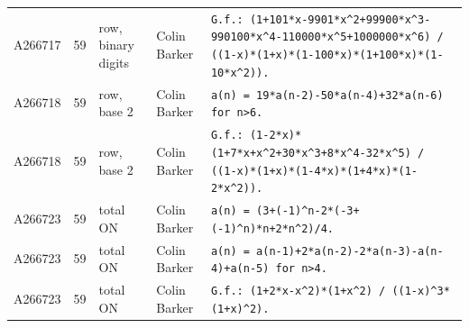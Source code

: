 \documentclass[11pt]{article}
\theoremstyle{definition}
\theoremstyle{remark}
\begin{document}
{\begin{longtable}{p{1.3cm}p{0.7cm}p{2.4cm}p{2.3cm}p{7.3cm}}
A266717 & 59 & row, binary digits & Colin Barker & \texttt{G.f.: \allowbreak{}(1+\allowbreak{}101*\allowbreak{}x-\allowbreak{}9901*\allowbreak{}x\^{}2+\allowbreak{}99900*\allowbreak{}x\^{}3-\allowbreak{}990100*\allowbreak{}x\^{}4-\allowbreak{}110000*\allowbreak{}x\^{}5+\allowbreak{}1000000*\allowbreak{}x\^{}6)\allowbreak{} \allowbreak{}/\allowbreak{} \allowbreak{}((1-\allowbreak{}x)\allowbreak{}*\allowbreak{}(1+\allowbreak{}x)\allowbreak{}*\allowbreak{}(1-\allowbreak{}100*\allowbreak{}x)\allowbreak{}*\allowbreak{}(1+\allowbreak{}100*\allowbreak{}x)\allowbreak{}*\allowbreak{}(1-\allowbreak{}10*\allowbreak{}x\^{}2)\allowbreak{})\allowbreak{}.} \\
A266718 & 59 & row, base 2 & Colin Barker & \texttt{a(n)\allowbreak{} \allowbreak{}=\allowbreak{} \allowbreak{}19*\allowbreak{}a(n-\allowbreak{}2)\allowbreak{}-\allowbreak{}50*\allowbreak{}a(n-\allowbreak{}4)\allowbreak{}+\allowbreak{}32*\allowbreak{}a(n-\allowbreak{}6)\allowbreak{} \allowbreak{}for \allowbreak{}n>6.} \\
A266718 & 59 & row, base 2 & Colin Barker & \texttt{G.f.: \allowbreak{}(1-\allowbreak{}2*\allowbreak{}x)\allowbreak{}*\allowbreak{}(1+\allowbreak{}7*\allowbreak{}x+\allowbreak{}x\^{}2+\allowbreak{}30*\allowbreak{}x\^{}3+\allowbreak{}8*\allowbreak{}x\^{}4-\allowbreak{}32*\allowbreak{}x\^{}5)\allowbreak{} \allowbreak{}/\allowbreak{} \allowbreak{}((1-\allowbreak{}x)\allowbreak{}*\allowbreak{}(1+\allowbreak{}x)\allowbreak{}*\allowbreak{}(1-\allowbreak{}4*\allowbreak{}x)\allowbreak{}*\allowbreak{}(1+\allowbreak{}4*\allowbreak{}x)\allowbreak{}*\allowbreak{}(1-\allowbreak{}2*\allowbreak{}x\^{}2)\allowbreak{})\allowbreak{}.} \\
A266723 & 59 & total ON & Colin Barker & \texttt{a(n)\allowbreak{} \allowbreak{}=\allowbreak{} \allowbreak{}(3+\allowbreak{}(-\allowbreak{}1)\allowbreak{}\^{}n-\allowbreak{}2*\allowbreak{}(-\allowbreak{}3+\allowbreak{}(-\allowbreak{}1)\allowbreak{}\^{}n)\allowbreak{}*\allowbreak{}n+\allowbreak{}2*\allowbreak{}n\^{}2)\allowbreak{}/\allowbreak{}4.} \\
A266723 & 59 & total ON & Colin Barker & \texttt{a(n)\allowbreak{} \allowbreak{}=\allowbreak{} \allowbreak{}a(n-\allowbreak{}1)\allowbreak{}+\allowbreak{}2*\allowbreak{}a(n-\allowbreak{}2)\allowbreak{}-\allowbreak{}2*\allowbreak{}a(n-\allowbreak{}3)\allowbreak{}-\allowbreak{}a(n-\allowbreak{}4)\allowbreak{}+\allowbreak{}a(n-\allowbreak{}5)\allowbreak{} \allowbreak{}for \allowbreak{}n>4.} \\
A266723 & 59 & total ON & Colin Barker & \texttt{G.f.: \allowbreak{}(1+\allowbreak{}2*\allowbreak{}x-\allowbreak{}x\^{}2)\allowbreak{}*\allowbreak{}(1+\allowbreak{}x\^{}2)\allowbreak{} \allowbreak{}/\allowbreak{} \allowbreak{}((1-\allowbreak{}x)\allowbreak{}\^{}3*\allowbreak{}(1+\allowbreak{}x)\allowbreak{}\^{}2)\allowbreak{}.} \\

\end{longtable}}
\end{document}
